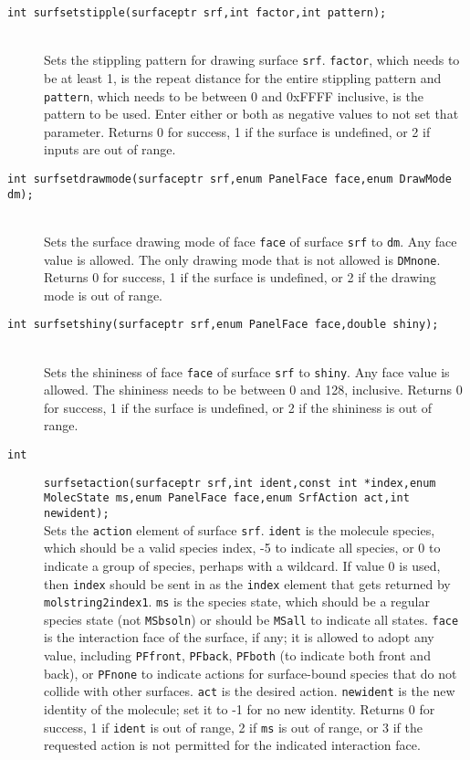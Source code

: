 \documentclass {scrbook}
\newcommand {\ttt} {\texttt}
\begin{document}
\begin{description}
\item[\ttt{int surfsetstipple(surfaceptr srf,int factor,int pattern);}]
\hfill \\
Sets the stippling pattern for drawing surface \ttt{srf}. \ttt{factor}, which needs to be at least 1, is the repeat distance for the entire stippling pattern and \ttt{pattern}, which needs to be between 0 and 0xFFFF inclusive, is the pattern to be used. Enter either or both as negative values to not set that parameter. Returns 0 for success, 1 if the surface is undefined, or 2 if inputs are out of range.

\item[\ttt{int surfsetdrawmode(surfaceptr srf,enum PanelFace face,enum DrawMode dm);}]
\hfill \\
Sets the surface drawing mode of face \ttt{face} of surface \ttt{srf} to \ttt{dm}. Any face value is allowed. The only drawing mode that is not allowed is \ttt{DMnone}. Returns 0 for success, 1 if the surface is undefined, or 2 if the drawing mode is out of range.

\item[\ttt{int surfsetshiny(surfaceptr srf,enum PanelFace face,double shiny);}]
\hfill \\
Sets the shininess of face \ttt{face} of surface \ttt{srf} to \ttt{shiny}. Any face value is allowed. The shininess needs to be between 0 and 128, inclusive. Returns 0 for success, 1 if the surface is undefined, or 2 if the shininess is out of range.

\item[\ttt{int}]
\ttt{surfsetaction(surfaceptr srf,int ident,const int *index,enum MolecState ms,enum PanelFace face,enum SrfAction act,int newident);}
\hfill \\
Sets the \ttt{action} element of surface \ttt{srf}. \ttt{ident} is the molecule species, which should be a valid species index, -5 to indicate all species, or 0 to indicate a group of species, perhaps with a wildcard. If value 0 is used, then \ttt{index} should be sent in as the \ttt{index} element that gets returned by \ttt{molstring2index1}. \ttt{ms} is the species state, which should be a regular species state (not \ttt{MSbsoln}) or should be \ttt{MSall} to indicate all states. \ttt{face} is the interaction face of the surface, if any; it is allowed to adopt any value, including \ttt{PFfront}, \ttt{PFback}, \ttt{PFboth} (to indicate both front and back), or \ttt{PFnone} to indicate actions for surface-bound species that do not collide with other surfaces. \ttt{act} is the desired action. \ttt{newident} is the new identity of the molecule; set it to -1 for no new identity. Returns 0 for success, 1 if \ttt{ident} is out of range, 2 if \ttt{ms} is out of range, or 3 if the requested action is not permitted for the indicated interaction face.


\end{description}
\end{document}
